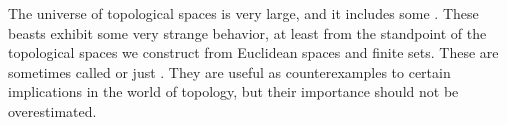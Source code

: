 
The universe of topological spaces is very large, and it includes some .
These beasts exhibit some very strange behavior, at least from the standpoint of the  topological spaces we construct from Euclidean spaces and finite sets.
These are sometimes called  or just .
They are useful as counterexamples to certain implications in the world of topology, but their importance should not be overestimated.



